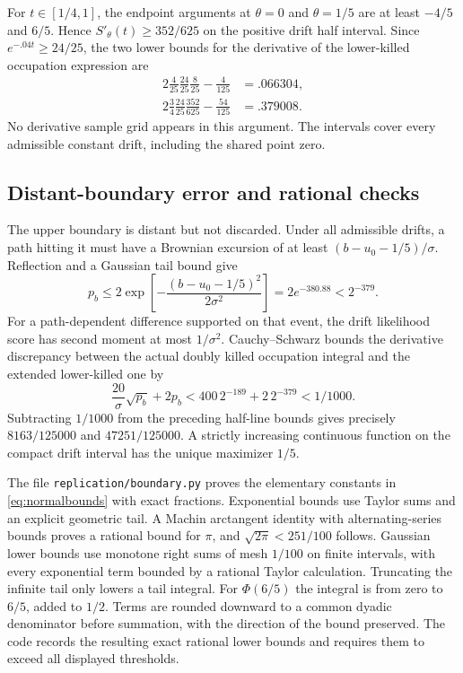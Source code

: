 For $t\in[1/4,1]$, the endpoint arguments at $\theta=0$ and $\theta=1/5$ are at least $-4/5$ and $6/5$. Hence $S'_\theta(t)\ge352/625$ on the positive drift half interval. Since $e^{-.04t}\ge24/25$, the two lower bounds for the derivative of the lower-killed occupation expression are
\begin{align}
 2\frac4{25}\frac{24}{25}\frac8{25}-\frac4{125}&=.066304,\\
 2\frac34\frac{24}{25}\frac{352}{625}-\frac{54}{125}&=.379008.
\end{align}
No derivative sample grid appears in this argument. The intervals cover every admissible constant drift, including the shared point zero.

\subsection{Distant-boundary error and rational checks}
The upper boundary is distant but not discarded. Under all admissible drifts, a path hitting it must have a Brownian excursion of at least $(b-u_0-1/5)/\sigma$. Reflection and a Gaussian tail bound give
\begin{equation}
 p_b\le2\exp\left[-\frac{(b-u_0-1/5)^2}{2\sigma^2}\right]
 =2e^{-380.88}<2^{-379}.
\end{equation}
For a path-dependent difference supported on that event, the drift likelihood score has second moment at most $1/\sigma^2$. Cauchy--Schwarz bounds the derivative discrepancy between the actual doubly killed occupation integral and the extended lower-killed one by
\begin{equation}
 \frac{20}{\sigma}\sqrt{p_b}+2p_b
 <400\,2^{-189}+2\,2^{-379}<1/1000.
\end{equation}
Subtracting $1/1000$ from the preceding half-line bounds gives precisely $8163/125000$ and $47251/125000$. A strictly increasing continuous function on the compact drift interval has the unique maximizer $1/5$.

The file \texttt{replication/boundary.py} proves the elementary constants in \eqref{eq:normalbounds} with exact fractions. Exponential bounds use Taylor sums and an explicit geometric tail. A Machin arctangent identity with alternating-series bounds proves a rational bound for $\pi$, and $\sqrt{2\pi}<251/100$ follows. Gaussian lower bounds use monotone right sums of mesh $1/100$ on finite intervals, with every exponential term bounded by a rational Taylor calculation. Truncating the infinite tail only lowers a tail integral. For $\Phi(6/5)$ the integral is from zero to $6/5$, added to $1/2$. Terms are rounded downward to a common dyadic denominator before summation, with the direction of the bound preserved. The code records the resulting exact rational lower bounds and requires them to exceed all displayed thresholds.

